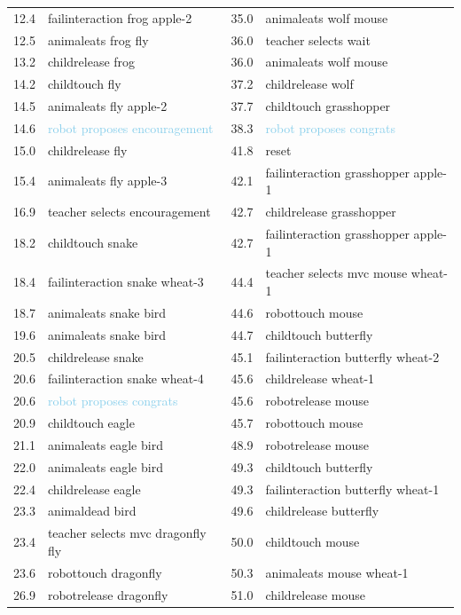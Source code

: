 \begin{table}[ht]
\begin{tabularx}{\textwidth}{@{}L{.2}L{1.8}|L{.2}L{1.8}@{}}
12.4 & failinteraction frog apple-2 & 35.0 & animaleats wolf mouse\\
12.5 & animaleats frog fly & 36.0 & \textcolor{BurntOrange}{teacher selects wait}\\
13.2 & childrelease frog & 36.0 & animaleats wolf mouse\\
14.2 & childtouch fly & 37.2 & childrelease wolf\\
14.5 & animaleats fly apple-2 & 37.7 & childtouch grasshopper\\
14.6 & \textcolor{SkyBlue}{robot proposes encouragement} & 38.3 & \textcolor{SkyBlue}{robot proposes congrats}\\
15.0 & childrelease fly & 41.8 & reset\\
15.4 & animaleats fly apple-3 & 42.1 & failinteraction grasshopper apple-1\\
16.9 & \textcolor{BurntOrange}{teacher selects encouragement} & 42.7 & childrelease grasshopper\\
18.2 & childtouch snake & 42.7 & failinteraction grasshopper apple-1\\
18.4 & failinteraction snake wheat-3 & 44.4 & \textcolor{BurntOrange}{teacher selects mvc mouse wheat-1}\\
18.7 & animaleats snake bird & 44.6 & robottouch mouse\\
19.6 & animaleats snake bird & 44.7 & childtouch butterfly\\
20.5 & childrelease snake & 45.1 & failinteraction butterfly wheat-2\\
20.6 & failinteraction snake wheat-4 & 45.6 & childrelease wheat-1\\
20.6 & \textcolor{SkyBlue}{robot proposes congrats} & 45.6 & robotrelease mouse\\
20.9 & childtouch eagle & 45.7 & robottouch mouse\\
21.1 & animaleats eagle bird & 48.9 & robotrelease mouse\\
22.0 & animaleats eagle bird & 49.3 & childtouch butterfly\\
22.4 & childrelease eagle & 49.3 & failinteraction butterfly wheat-1\\
23.3 & animaldead bird & 49.6 & childrelease butterfly\\
23.4 & \textcolor{BurntOrange}{teacher selects mvc dragonfly fly} & 50.0 & childtouch mouse\\
23.6 & robottouch dragonfly & 50.3 & animaleats mouse wheat-1\\
26.9 & robotrelease dragonfly & 51.0 & childrelease mouse\\
		\bottomrule
	\end{tabularx}
\end{table}

